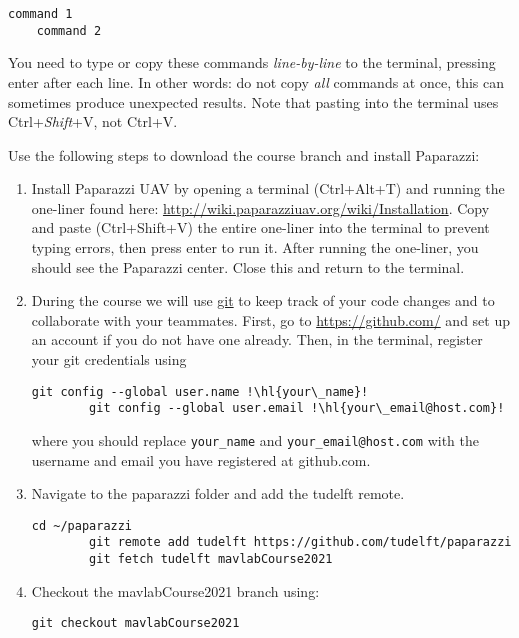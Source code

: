 \begin{lstlisting}[style=Bash]
	command 1
	command 2
\end{lstlisting}

You need to type or copy these commands \emph{line-by-line} to the terminal, pressing enter after each line. In other words: do not copy \emph{all} commands at once, this can sometimes produce unexpected results. Note that pasting into the terminal uses Ctrl+\emph{Shift}+V, not Ctrl+V.

Use the following steps to download the course branch and install Paparazzi:

\begin{enumerate}
	\item{Install Paparazzi UAV by opening a terminal (Ctrl+Alt+T) and running the one-liner found here: \url{http://wiki.paparazziuav.org/wiki/Installation}. Copy and paste (Ctrl+Shift+V) the entire one-liner into the terminal to prevent typing errors, then press enter to run it. After running the one-liner, you should see the Paparazzi center. Close this and return to the terminal.}
	
	\item{During the course we will use \href{https://git-scm.com/}{git} to keep track of your code changes and to collaborate with your teammates. First, go to \url{https://github.com/} and set up an account if you do not have one already. Then, in the terminal, register your git credentials using
	\begin{lstlisting}[style=Bash]
		git config --global user.name !\hl{your\_name}!
		git config --global user.email !\hl{your\_email@host.com}!
	\end{lstlisting}
	where you should replace \texttt{your\_name} and \texttt{your\_email@host.com} with the username and email you have registered at github.com.}
	
	\item Navigate to the paparazzi folder and add the tudelft remote.
	\begin{lstlisting}[style=Bash]
		cd ~/paparazzi
		git remote add tudelft https://github.com/tudelft/paparazzi
		git fetch tudelft mavlabCourse2021
	\end{lstlisting}
	
	\item Checkout the mavlabCourse2021 branch using:
	\begin{lstlisting}[style=Bash]
		git checkout mavlabCourse2021
	\end{lstlisting}
	

\end{enumerate}
